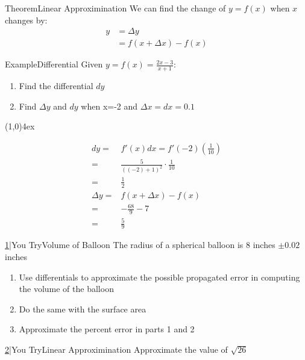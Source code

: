 \documentclass{MathNotes}
\newenvironment{example}[1]{\begin{BlueBox}{Example}{#1}}{\end{BlueBox}}
\newenvironment{theorem}[1]{\begin{GrayBox}{Theorem}{#1}}{\end{GrayBox}}
\newenvironment{practice}[2]{\begin{PurpleBox}{\texorpdfstring{#1}\Big|You Try}{#2}}{\end{PurpleBox}}
\newcommand{\br}{
	\begin{center}
		\line(1,0){4ex}
	\end{center}}
\begin{document}
\begin{theorem}{Linear Approximination}\label{th:linear-approx}
	We can find the change of $y=f(x)$ when $x$ changes by:
	\begin{align*}
		y & =\Delta y           \\
		  & =f(x+\Delta x)-f(x)
	\end{align*}
\end{theorem}

\begin{example}{Differential}\label{ex:differential}
	Given $\displaystyle y=f(x)=\frac{2x-3}{x+1}$:
	\begin{enumerate}
		\item Find the differential $dy$\\\[\]
		\item Find $\Delta y$ and $dy$ when x=-2 and $\Delta x=dx=0.1$
	\end{enumerate}
	\br
	\begin{align*}
		dy =       & f'(x)dx=f'(-2)(\frac{1}{10})                     \\
		=          & \frac{5}{\left((-2)+1\right)^2}\cdot\frac{1}{10} \\
		=          & \frac{1}{2}                                      \\
		\Delta y = & f(x+\Delta x)-f(x)                               \\
		=          & -\frac{68}{9}-7                                  \\
		=          & \frac{5}{9}
	\end{align*}
\end{example}

\begin{practice}{\hyperref[ans:volume-of-balloon]{1}}{Volume of Balloon}\label{prac:volume-of-balloon}
	The radius of a spherical balloon is 8 inches $\pm 0.02$ inches
	\begin{enumerate}
		\item Use differentials to approximate the possible propagated error in computing the volume of the balloon
		\item Do the same with the surface area
		\item Approximate the percent error in parts 1 and 2
	\end{enumerate}
\end{practice}

\begin{practice}{\hyperref[ans:linear-approx]{2}}{Linear Approximination}
	\label{prac:linear-approx}
	Approximate the value of $\displaystyle\sqrt{26}$
\end{practice}
\end{document}
